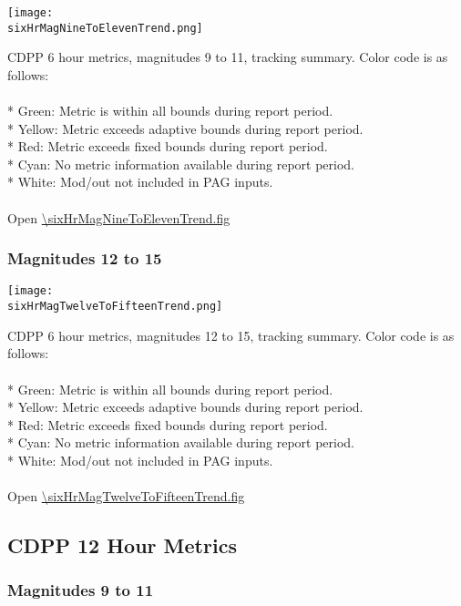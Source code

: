\begin{center}
\texttt{[image: \\sixHrMagNineToElevenTrend.png]}
\end{center}
CDPP 6 hour metrics, magnitudes 9 to 11, tracking summary. Color code is as follows:\\
\\
* Green: Metric is within all bounds during report period.\\
* Yellow: Metric exceeds adaptive bounds during report period.\\
* Red: Metric exceeds fixed bounds during report period.\\
* Cyan: No metric information available during report period.\\
* White: Mod/out not included in PAG inputs.\\
\\
Open \url{\sixHrMagNineToElevenTrend.fig}

\newpage

\subsubsection{Magnitudes 12 to 15}

\begin{center}
\texttt{[image: \\sixHrMagTwelveToFifteenTrend.png]}
\end{center}
CDPP 6 hour metrics, magnitudes 12 to 15, tracking summary. Color code is as follows:\\
\\
* Green: Metric is within all bounds during report period.\\
* Yellow: Metric exceeds adaptive bounds during report period.\\
* Red: Metric exceeds fixed bounds during report period.\\
* Cyan: No metric information available during report period.\\
* White: Mod/out not included in PAG inputs.\\
\\
Open \url{\sixHrMagTwelveToFifteenTrend.fig}

\newpage

\subsection{CDPP 12 Hour Metrics}

\subsubsection{Magnitudes 9 to 11}

